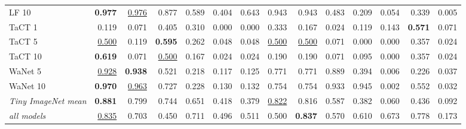 \begin{table}[htbp]
\begin{adjustbox}{max width=\textwidth}
\begin{tabular}{lrrrrrrrrrrrrr}
LF 10 & \textbf{0.977} & \underline{0.976} & 0.877 & 0.589 & \textcolor{black!45}{0.404} & 0.643 & 0.943 & 0.943 & \textcolor{black!45}{0.483} & \textcolor{black!45}{0.209} & \textcolor{black!45}{0.054} & \textcolor{black!45}{0.339} & \textcolor{black!45}{0.005} \\
TaCT 1 & \textcolor{black!45}{0.119} & \textcolor{black!45}{0.071} & \textcolor{black!45}{0.405} & \textcolor{black!45}{0.310} & \textcolor{black!45}{0.000} & \textcolor{black!45}{0.000} & \textcolor{black!45}{0.333} & \textcolor{black!45}{0.167} & \textcolor{black!45}{0.024} & \textcolor{black!45}{0.119} & \textcolor{black!45}{0.143} & \textbf{0.571} & \textcolor{black!45}{0.071} \\
TaCT 5 & \underline{0.500} & \textcolor{black!45}{0.119} & \textbf{0.595} & \textcolor{black!45}{0.262} & \textcolor{black!45}{0.048} & \textcolor{black!45}{0.048} & \underline{0.500} & \underline{0.500} & \textcolor{black!45}{0.071} & \textcolor{black!45}{0.000} & \textcolor{black!45}{0.000} & \textcolor{black!45}{0.357} & \textcolor{black!45}{0.024} \\
TaCT 10 & \textbf{0.619} & \textcolor{black!45}{0.071} & \underline{0.500} & \textcolor{black!45}{0.167} & \textcolor{black!45}{0.024} & \textcolor{black!45}{0.024} & \textcolor{black!45}{0.190} & \textcolor{black!45}{0.190} & \textcolor{black!45}{0.071} & \textcolor{black!45}{0.095} & \textcolor{black!45}{0.000} & \textcolor{black!45}{0.357} & \textcolor{black!45}{0.024} \\
WaNet 5 & \underline{0.928} & \textbf{0.938} & 0.521 & \textcolor{black!45}{0.218} & \textcolor{black!45}{0.117} & \textcolor{black!45}{0.125} & 0.771 & 0.771 & 0.889 & \textcolor{black!45}{0.394} & \textcolor{black!45}{0.006} & \textcolor{black!45}{0.226} & \textcolor{black!45}{0.037} \\
WaNet 10 & \textbf{0.970} & \underline{0.963} & 0.727 & \textcolor{black!45}{0.228} & \textcolor{black!45}{0.130} & \textcolor{black!45}{0.132} & 0.754 & 0.754 & 0.933 & 0.945 & \textcolor{black!45}{0.002} & 0.552 & \textcolor{black!45}{0.032} \\
\rowcolor{black!8}\emph{Tiny ImageNet mean} & \textbf{0.881} & 0.799 & 0.744 & 0.651 & \textcolor{black!45}{0.418} & \textcolor{black!45}{0.379} & \underline{0.822} & 0.816 & 0.587 & \textcolor{black!45}{0.382} & \textcolor{black!45}{0.060} & \textcolor{black!45}{0.436} & \textcolor{black!45}{0.092} \\
\rowcolor{black!8}\emph{all models} & \underline{0.835} & 0.703 & \textcolor{black!45}{0.450} & 0.711 & \textcolor{black!45}{0.496} & 0.511 & \textcolor{black!45}{0.500} & \textbf{0.837} & 0.570 & 0.610 & 0.673 & 0.778 & \textcolor{black!45}{0.173} \\
\bottomrule
\end{tabular}
\end{adjustbox}
\end{table}
